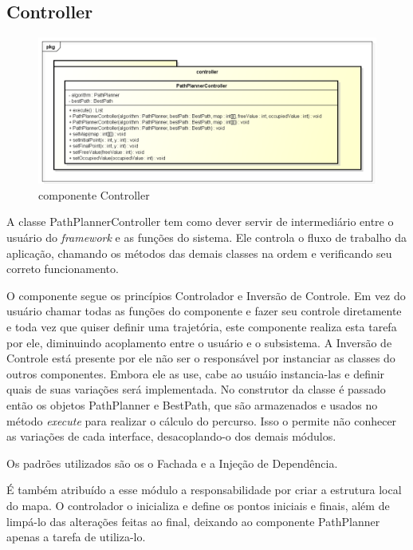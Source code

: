 \subsection{Controller}

\begin{figure}[h]
	\centering
	\label{fig22}
		\includegraphics[keepaspectratio=true,scale=0.5]{figuras/pkgcontroller.png}
	\caption{componente Controller}
\end{figure}

A classe PathPlannerController tem como dever servir de intermediário entre o usuário do \textit{framework} e as funções do sistema. Ele controla o fluxo de trabalho da aplicação, chamando os métodos das demais classes na ordem e verificando seu correto funcionamento.

O componente segue os princípios Controlador e Inversão de Controle. Em vez do usuário chamar todas as funções do componente e fazer seu controle diretamente e toda vez que quiser definir uma trajetória, este componente realiza esta tarefa por ele, diminuindo acoplamento entre o usuário e o subsistema. A Inversão de Controle está presente por ele não ser o responsável por instanciar as classes do outros componentes. Embora ele as use, cabe ao usuáio instancia-las e definir quais de suas variações será implementada. No construtor da classe é passado então os objetos PathPlanner e BestPath, que são armazenados e usados no método \textit{execute} para realizar o cálculo do percurso. Isso o permite não conhecer as variações de cada interface, desacoplando-o dos demais módulos.

Os padrões utilizados são os o Fachada e a Injeção de Dependência.

É também atribuído a esse módulo a responsabilidade por criar a estrutura local do mapa. O controlador o inicializa e define os pontos iniciais e finais, além de limpá-lo das alterações feitas ao final, deixando ao componente PathPlanner apenas a tarefa de utiliza-lo.

